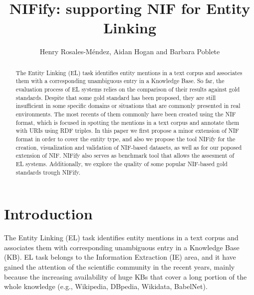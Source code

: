 \documentclass{llncs}
\begin{document}
\title{NIFify: supporting NIF for Entity Linking}
\author{Henry Rosales-M\'endez, Aidan Hogan and Barbara Poblete}

\newcommand{\ds}{\textsc{VoxEL}\xspace}

\maketitle  %
\begin{abstract}
The Entity Linking (EL) task identifies entity mentions in a text corpus and associates them with a corresponding unambiguous entry in a Knowledge Base. So far, the evaluation process of EL systems relies on the comparison of their results against gold standards. Despite that some gold standard has been proposed, they are still insufficient in some specific domains or situations that are commonly presented in real environments. %
The most recents of them commonly have been created using the NIF format, which is focused in spotting the mentions in a text corpus and annotate them with URIs using RDF triples. In this paper we first propose a minor extension of NIF format in order to cover the entity type, and also we propose the tool NIFify for the creation, visualization and validation of NIF-based datasets, as well as for our poposed extension of NIF. NIFify also serves as benchmark tool that allows the assesment of EL systems. Additionally, we explore the quality of some popular NIF-based gold standards trough NIFify. 
\\
\end{abstract}



\section{Introduction} 
\label{sec:intro}

The Entity Linking (EL) task identifies entity mentions in a text corpus and associates them with corresponding unambiguous entry in a Knowledge Base (KB). EL task belongs to the Information Extraction (IE) area, and it have gained the attention of the scientific community in the recent years, mainly because the increasing availability of huge KBs that cover a long portion of the whole knowledge (e.g., Wikipedia, DBpedia, Wikidata, BabelNet).
\end{document}
